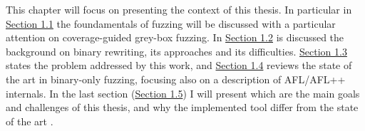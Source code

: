 This chapter will focus on presenting the context of this thesis.
In particular in \hyperref[sec:fuzz_background]{ Section 1.1} the foundamentals of fuzzing will be discussed with a particular attention on coverage-guided grey-box fuzzing.
In \hyperref[sec:biniary_rewriting]{Section 1.2} is discussed the background on binary rewriting, its approaches and its difficulties.
\hyperref[sec:problem_statement]{Section 1.3} states the problem addressed by this work, 
and \hyperref[sec:state_of_the_art]{Section 1.4} reviews the state of the art in binary-only fuzzing, focusing also on a description
of AFL/AFL++ internals. In the last section (\hyperref[sec:goals-and-challenges]{Section 1.5}) I will present which are the main 
goals and challenges of this thesis, and why the implemented tool differ from the state of the art .

